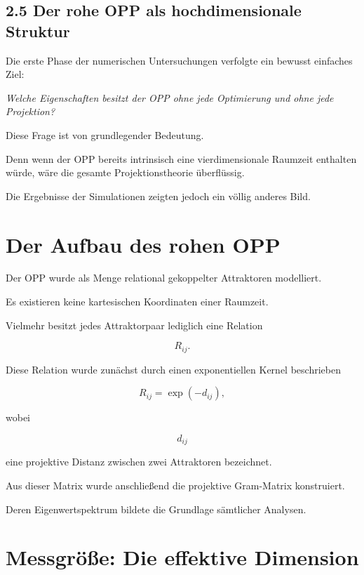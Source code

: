 \subsection{2.5 Der rohe OPP als hochdimensionale Struktur}

Die erste Phase der numerischen Untersuchungen verfolgte ein bewusst einfaches Ziel:

\begin{center}
\emph{Welche Eigenschaften besitzt der OPP ohne jede Optimierung und ohne jede Projektion?}
\end{center}

Diese Frage ist von grundlegender Bedeutung.

Denn wenn der OPP bereits intrinsisch eine vierdimensionale Raumzeit enthalten würde, wäre die gesamte Projektionstheorie überflüssig.

Die Ergebnisse der Simulationen zeigten jedoch ein völlig anderes Bild.


\section*{Der Aufbau des rohen OPP}

Der OPP wurde als Menge relational gekoppelter Attraktoren modelliert.

Es existieren keine kartesischen Koordinaten einer Raumzeit.

Vielmehr besitzt jedes Attraktorpaar lediglich eine Relation

\[
R_{ij}.
\]

Diese Relation wurde zunächst durch einen exponentiellen Kernel beschrieben

\[
R_{ij}
=
\exp(-d_{ij}),
\]

wobei

\[
d_{ij}
\]

eine projektive Distanz zwischen zwei Attraktoren bezeichnet.

Aus dieser Matrix wurde anschließend die projektive Gram-Matrix konstruiert.

Deren Eigenwertspektrum bildete die Grundlage sämtlicher Analysen.


\section*{Messgröße: Die effektive Dimension}

